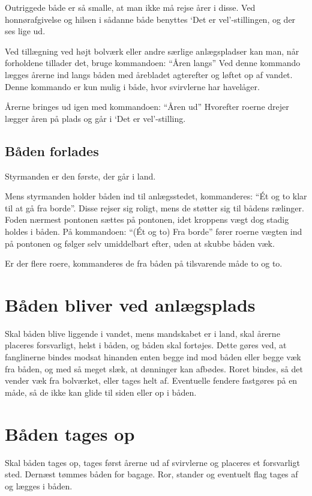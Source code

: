 \documentclass{article}
\begin{document}
Outriggede både er så smalle, at man ikke må rejse årer i disse. Ved
honnørafgivelse og hilsen i sådanne både benyttes `Det er
vel'-stillingen, og der ses lige ud.

Ved tillægning ved højt bolværk eller andre særlige anlægspladser kan
man, når forholdene tillader det, bruge kommandoen: ``Åren langs'' Ved
denne kommando lægges årerne ind langs båden med årebladet agterefter og
løftet op af vandet. Denne kommando er kun mulig i både, hvor svirvlerne
har havelåger.

Årerne bringes ud igen med kommandoen: ``Åren ud'' Hvorefter roerne
drejer lægger åren på plads og går i `Det er vel'-stilling.

\subsection{Båden forlades}

Styrmanden er den første, der går i land.

Mens styrmanden holder båden ind til anlægsstedet, kommanderes: ``Ét og
to klar til at gå fra borde''. Disse rejser sig roligt, mens de støtter
sig til bådens rælinger. Foden nærmest pontonen sættes på pontonen, idet
kroppens vægt dog stadig holdes i båden. På kommandoen: ``(Ét og to) Fra
borde'' fører roerne vægten ind på pontonen og følger selv umiddelbart
efter, uden at skubbe båden væk.

Er der flere roere, kommanderes de fra båden på tilsvarende måde to og
to.

\section{Båden bliver ved anlægsplads}

Skal båden blive liggende i vandet, mens mandskabet er i land, skal
årerne placeres forsvarligt, helst i båden, og båden skal fortøjes. Dette
gøres ved, at fanglinerne bindes modsat hinanden enten begge ind mod
båden eller begge væk fra båden, og med så meget slæk, at dønninger kan
afbødes. Roret bindes, så det vender væk fra bolværket, eller tages helt
af. Eventuelle fendere fastgøres på en måde, så de ikke kan glide til
siden eller op i båden.

\section{Båden tages op}

Skal båden tages op, tages først årerne ud af svirvlerne og placeres et
forsvarligt sted. Dernæst tømmes båden for bagage. Ror, stander og
eventuelt flag tages af og lægges i båden.
\end{document}
